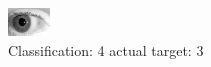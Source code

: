 \begin{figure}[h!]
\begin{center}
\includegraphics[width=0.60\columnwidth]{figures/ID268_class_4_target_3.png}
\end{center}
\caption{ Classification: 4 actual target: 3}
\label{fig:ID268_class_4_target_3}
\end{figure}
